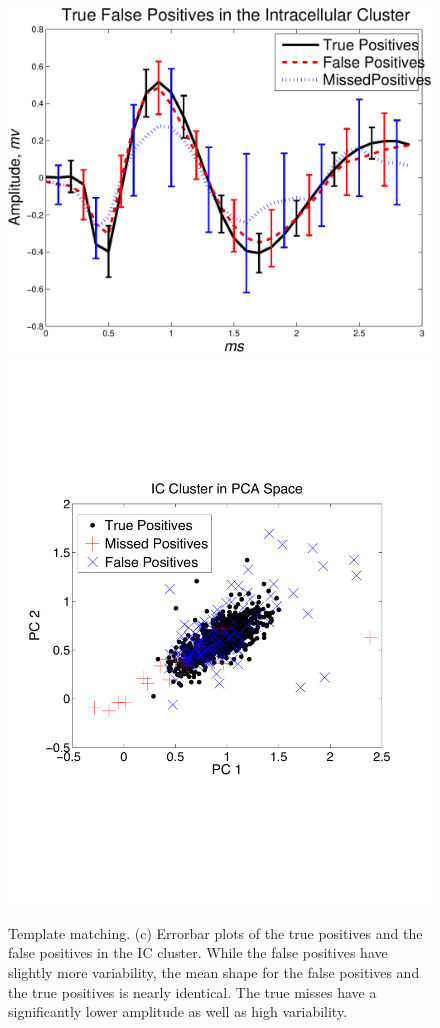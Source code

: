 \begin{center}
\begin{figure}
	\includegraphics[width=.3\textwidth]{../figs/IntracellularTrueFalsePositivesv2}
	\includegraphics[width=.3\textwidth]{../figs/new/ICclusteroldpca.pdf}
\caption{
Template matching.
(c) Errorbar plots of the true positives and the false positives in the IC cluster.  While the false positives have slightly more variability, the mean shape for the false positives and the true positives is nearly identical.  The true misses have a significantly lower amplitude as well as high variability. 
} \label{fig:IC-PCA}
\end{figure}
\end{center}



% 
% 
% 
% 
% 
% 
% 
% 
% 
% 
% 
